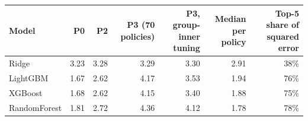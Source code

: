 \begin{tabular}{lrrrrrr}
\toprule
Model & P0 & P2 & P3 (70 policies) & P3, group-inner tuning & Median per policy & Top-5 share of squared error \\
\midrule
Ridge & 3.23 & 3.28 & 3.29 & 3.30 & 2.91 & 38\% \\
LightGBM & 1.67 & 2.62 & 4.17 & 3.53 & 1.94 & 76\% \\
XGBoost & 1.68 & 2.62 & 4.15 & 3.40 & 1.88 & 75\% \\
RandomForest & 1.81 & 2.72 & 4.36 & 4.12 & 1.78 & 78\% \\
\bottomrule
\end{tabular}
